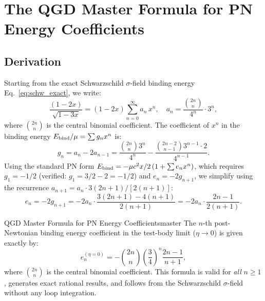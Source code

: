 \documentclass[11pt,a4paper]{article}
\theoremstyle{definition}
\theoremstyle{remark}
\begin{document}
	\section{The QGD Master Formula for PN Energy Coefficients}
	\label{sec:master}
	
	\subsection{Derivation}
	
	Starting from the exact Schwarzschild $\sigma$-field binding energy
	Eq.~\eqref{eq:schw_exact}, we write:
	\begin{equation}
		\frac{(1-2x)}{\sqrt{1-3x}}
		= (1-2x)\sum_{n=0}^\infty a_n\,x^n,
		\quad
		a_n = \frac{\binom{2n}{n}}{4^n}\cdot 3^n,
		\label{eq:series_an}
	\end{equation}
	where $\binom{2n}{n}$ is the central binomial coefficient.
	The coefficient of $x^n$ in the binding energy
	$E_{\rm bind}/\mu=\sum g_n x^n$ is:
	\begin{equation}
		g_n = a_n - 2a_{n-1}
		= \frac{\binom{2n}{n}3^n}{4^n} - \frac{\binom{2n-2}{n-1}3^{n-1}\cdot 2}{4^{n-1}}.
		\label{eq:gn}
	\end{equation}
	Using the standard PN form $E_{\rm bind}=-\mu c^2 x/2\,(1+\sum e_n x^n)$,
	which requires $g_1=-1/2$ (verified: $g_1=3/2-2=-1/2$) and
	$e_n=-2g_{n+1}$, we simplify using the recurrence
	$a_{n+1}=a_n\cdot 3(2n+1)/[2(n+1)]$:
	\begin{equation}
		e_n = -2g_{n+1} = -2a_n\cdot\frac{3(2n+1)-4(n+1)}{2(n+1)}
		= -2a_n\cdot\frac{2n-1}{2(n+1)}.
	\end{equation}
	
	\begin{theorem}{QGD Master Formula for PN Energy Coefficients}{master}
		The $n$-th post-Newtonian binding energy coefficient in the test-body
		limit ($\eta\to0$) is given exactly by:
		\begin{equation}
			\boxed{
				e_n^{(\eta=0)}
				= -\binom{2n}{n}\!\left(\frac{3}{4}\right)^{\!n}\frac{2n-1}{n+1},
			}
			\label{eq:master_formula}
		\end{equation}
		where $\binom{2n}{n}$ is the central binomial coefficient.
		This formula is valid for \emph{all} $n\geq1$, generates exact rational
		results, and follows from the Schwarzschild $\sigma$-field without any
		loop integration.
	\end{theorem}
	
\end{document}
